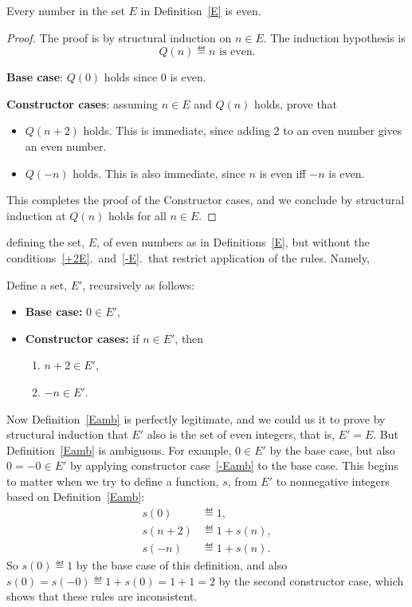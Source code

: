 \begin{definition}
\begin{lemma*}
Every number in the set $E$ in Definition~\ref{E} is even.
\begin{proof}
The proof is by structural induction on $n \in E$.  The induction
hypothesis is 
\[
Q(n) \eqdef \text{$n$ is even}.
\]

\textbf{Base case}: $Q(0)$ holds since 0 is even.

\textbf{Constructor cases}: assuming $n \in E$ and $Q(n)$ holds, prove
that
\begin{itemize}

\item $Q(n+2)$ holds.  This is immediate, since adding 2 to an even number
  gives an even number.

\item $Q(-n)$ holds.  This is also immediate, since $n$ is even iff $-n$ is
even.

\end{itemize}

This completes the proof of the Constructor cases, and we conclude by
structural induction at $Q(n)$ holds for all $n \in E$.
\end{proof}

\end{lemma*}


defining the set, $E$, of even numbers as in Definitions~\ref{E}, but
without the conditions~\ref{+2E}.\ and~\ref{-E}.\ that restrict application of
the rules.  Namely,

\begin{definition}\label{Eamb}
Define a set, $E'$, recursively as follows:
\begin{itemize}
\item \textbf{Base case:} $0 \in E'$,\label{0Eamb}
\item \textbf{Constructor cases:} if $n \in E'$, then
\begin{enumerate}
\item $n+2 \in E'$, \label{+2Eamb}
\item $-n \in E'$.\label{-Eamb}
\end{enumerate}
\end{itemize}
\end{definition}

Now Definition~\ref{Eamb} is perfectly legitimate, and we could us it to
prove by structural induction that $E'$ also is the set of even integers,
that is, $E'= E$.  But Definition~\ref{Eamb} is ambiguous.  For example,
$0\in E'$ by the base case, but also $0=-0 \in E'$ by applying constructor
case~\ref{-Eamb} to the base case.  This begins to matter when we try to
define a function, $s$, from $E'$ to nonnegative integers based on
Definition~\ref{Eamb}:
\begin{align*}
  s(0) & \eqdef 1,\\
s(n+2) & \eqdef 1+ s(n),\\
 s(-n) & \eqdef 1+ s(n).
\end{align*}
So $s(0) \eqdef 1$ by the base case of this definition, and also $s(0)=
s(-0) \eqdef 1+s(0) = 1 + 1 = 2$ by the second constructor case, which
shows that these rules are inconsistent.


\end{definition}
